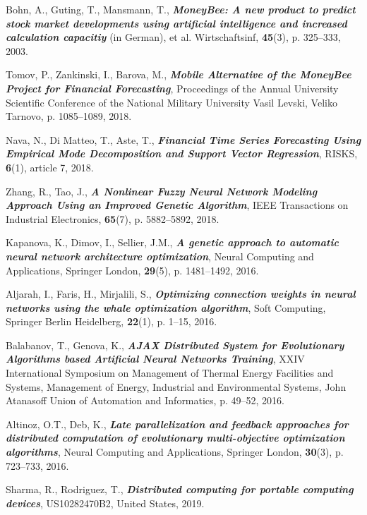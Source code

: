 \documentclass[runningheads]{llncs}
\begin{document}
\begin{thebibliography}{8}
 Bohn, A., Guting, T., Mansmann, T., \textbf{\textit{MoneyBee: A new product to predict stock market developments using artificial intelligence and increased calculation capacitiy}} (in German), et al. Wirtschaftsinf, \textbf{45}(3), p. 325--333, 2003.

 Tomov, P., Zankinski, I., Barova, M., \textbf{\textit{Mobile Alternative of the MoneyBee Project for Financial Forecasting}}, Proceedings of the Annual University Scientific Conference of the National Military University Vasil Levski, Veliko Tarnovo, p. 1085--1089, 2018.

 Nava, N., Di Matteo, T., Aste, T., \textbf{\textit{Financial Time Series Forecasting Using Empirical Mode Decomposition and Support Vector Regression}}, RISKS, \textbf{6}(1), article 7, 2018.

 Zhang, R., Tao, J., \textbf{\textit{A Nonlinear Fuzzy Neural Network Modeling Approach Using an Improved Genetic Algorithm}}, IEEE Transactions on Industrial Electronics, \textbf{65}(7), p. 5882--5892, 2018.

 Kapanova, K., Dimov, I., Sellier, J.M., \textbf{\textit{A genetic approach to automatic neural network architecture optimization}}, Neural Computing and Applications, Springer London, \textbf{29}(5), p. 1481--1492, 2016.

 Aljarah, I., Faris, H., Mirjalili, S., \textbf{\textit{Optimizing connection weights in neural networks using the whale optimization algorithm}}, Soft Computing, Springer Berlin Heidelberg, \textbf{22}(1), p. 1–15, 2016.

 Balabanov, T., Genova, K., \textbf{\textit{AJAX Distributed System for Evolutionary Algorithms based Artificial Neural Networks Training}}, XXIV International Symposium on Management of Thermal Energy Facilities and Systems, Management of Energy, Industrial and Environmental Systems, John Atanasoff Union of Automation and Informatics, p. 49--52, 2016.

 Altinoz, O.T., Deb, K., \textbf{\textit{Late parallelization and feedback approaches for distributed computation of evolutionary multi-objective optimization algorithms}}, Neural Computing and Applications, Springer London, \textbf{30}(3), p. 723--733, 2016.

 Sharma, R., Rodriguez, T., \textbf{\textit{Distributed computing for portable computing devices}}, US10282470B2, United States, 2019.


\end{thebibliography}
\end{document}
